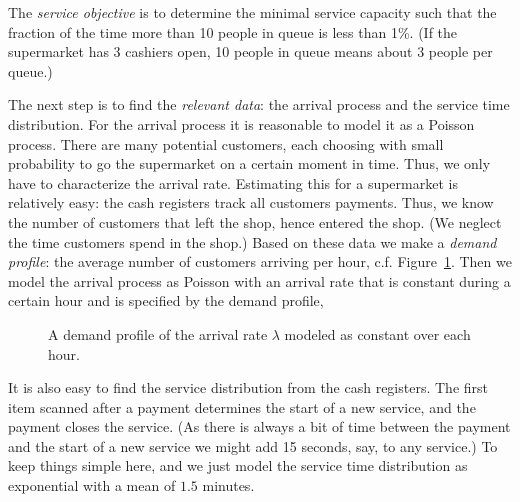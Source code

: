 The \emph{service objective} is to determine the minimal service
capacity such that the fraction of the time more than 
10 people in queue is less than 1\%. (If the supermarket has 3 cashiers open, 10 people in queue  means about 3 people per queue.)

The next step is to find the \emph{relevant data}: the arrival process and the service time distribution. For the arrival process it is reasonable to model it as a Poisson process. There are many potential customers, each choosing with small probability to go the supermarket on a certain moment in time. Thus, we only have to  characterize the arrival rate. Estimating this for a supermarket  is relatively easy: the cash registers track all customers
payments. Thus, we know the number of customers that left the shop,
hence entered the shop. (We neglect the time customers spend in the
shop.) Based on these data we make a \emph{demand profile}: the
average number of customers arriving per hour, c.f. Figure~\ref{fig:loadprofile}. Then we model the arrival process as Poisson with an arrival rate that is constant during a certain hour and is specified by the demand profile, 

\begin{figure}[t]
  \centering
{}
  \caption{A  demand profile of the arrival rate $\lambda$ modeled as constant over each hour.}
  \label{fig:loadprofile}
\end{figure}


It is also easy to find the service distribution from the cash
registers. The first item scanned after a payment determines the start
of a new service, and the payment closes the service. (As there is
always a bit of time between the payment and the start of a new
service we might add 15 seconds, say, to any service.)
To keep things simple here, and we just model the service time distribution as
exponential with a mean of $1.5$ minutes. 

